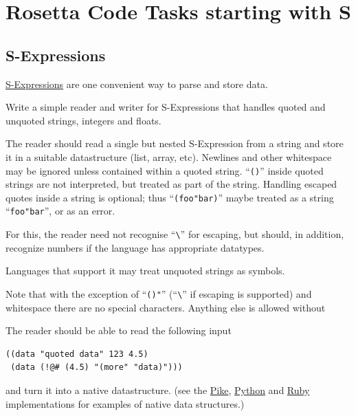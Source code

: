 %
%
%

\chapter{Rosetta Code Tasks starting with S}

\section*{S-Expressions}

\href{http://en.wikipedia.org/wiki/S-Expression}{S-Expressions} are one
convenient way to parse and store data.

Write a simple reader and writer for S-Expressions that handles quoted
and unquoted strings, integers and floats.

The reader should read a single but nested S-Expression from a string
and store it in a suitable datastructure (list, array, etc). Newlines
and other whitespace may be ignored unless contained within a quoted
string. ``\texttt{()}'' inside quoted strings are not interpreted, but
treated as part of the string. Handling escaped quotes inside a string
is optional; thus ``\texttt{(foo"bar)}'' maybe treated as a string
``\texttt{foo"bar}'', or as an error.

For this, the reader need not recognise ``\texttt{\textbackslash{}}''
for escaping, but should, in addition, recognize numbers if the language
has appropriate datatypes.

Languages that support it may treat unquoted strings as symbols.

Note that with the exception of ``\texttt{()"}''
(``\texttt{\textbackslash{}}'' if escaping is supported) and whitespace
there are no special characters. Anything else is allowed without

The reader should be able to read the following input

\begin{verbatim}
((data "quoted data" 123 4.5)
 (data (!@# (4.5) "(more" "data)")))
\end{verbatim}

and turn it into a native datastructure. (see the \hyperref[Pike]{Pike},
\hyperref[Python]{Python} and \hyperref[Ruby]{Ruby} implementations for
examples of native data structures.)

